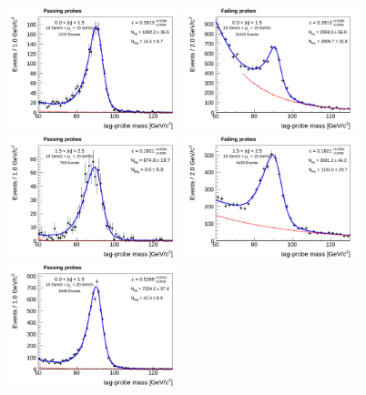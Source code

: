 \begin{figure}[!htbp]
\begin{center}
\includegraphics[width=0.45\textwidth]{figures/ElectronSelectionEffMassFitPass_EtaPtBin0.pdf}
\includegraphics[width=0.45\textwidth]{figures/ElectronSelectionEffMassFitFail_EtaPtBin0.pdf}
\includegraphics[width=0.45\textwidth]{figures/ElectronSelectionEffMassFitPass_EtaPtBin1.pdf}
\includegraphics[width=0.45\textwidth]{figures/ElectronSelectionEffMassFitFail_EtaPtBin1.pdf}
\includegraphics[width=0.45\textwidth]{figures/ElectronSelectionEffMassFitPass_EtaPtBin2.pdf}

\end{center}
\end{figure}
